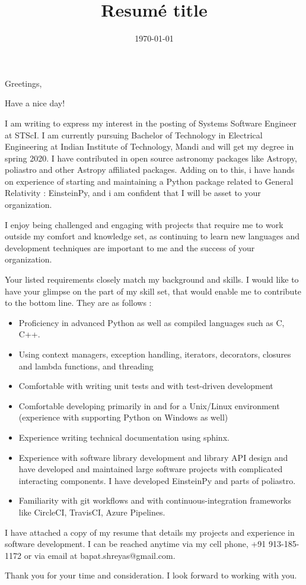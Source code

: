 \documentclass[11pt,a4paper,roman]{moderncv}        %
\title{Resumé title}                               %
\begin{document}
\date{\today}
\opening{Greetings,}
\closing{Have a nice day!}
\makelettertitle

I am writing to express my interest in the posting of Systems Software Engineer at STScI. I am currently pursuing Bachelor of Technology  in Electrical Engineering  at Indian Institute of Technology, Mandi and will get my degree in spring 2020.  I have contributed in open source astronomy packages like Astropy, poliastro and other Astropy affiliated packages. Adding on to this, i have hands on experience of starting and maintaining a Python package related to General Relativity : EinsteinPy, and i am confident that I will be asset to your organization.

I enjoy being challenged and engaging with projects that require me to work outside my comfort and knowledge set, as continuing to learn new languages and development techniques are important to me and the success of your organization.

Your listed requirements closely match my background and skills. I would like to have your glimpse on the part of my skill set, that would enable me to contribute to the bottom line. They are as follows :

\begin{itemize}
    \item Proficiency in advanced Python as well as compiled languages such as C, C++.
    \item Using context managers, exception handling, iterators, decorators, closures and lambda functions, and threading
    \item Comfortable with writing unit tests and with test-driven development
    \item Comfortable developing primarily in and for a Unix/Linux environment (experience with supporting Python on Windows as well)
    \item Experience writing technical documentation using sphinx.
    \item Experience with software library development and library API design and have developed and maintained large software projects with complicated interacting components. I have developed EinsteinPy and parts of poliastro.
    \item Familiarity with git workflows and with continuous-integration frameworks like CircleCI, TravisCI, Azure Pipelines.
\end{itemize}

I have attached a copy of my resume that details my projects and experience in software development. I can be reached anytime via my cell phone, +91 913-185-1172 or via email at bapat.shreyas@gmail.com.

Thank you for your time and consideration. I look forward to working with you.




\makeletterclosing
\end{document}
